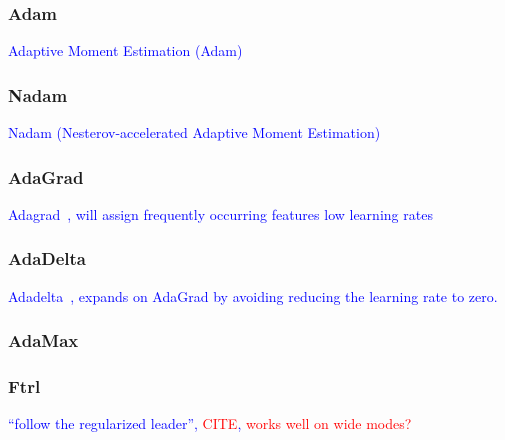 \subsubsection{Adam}

\textcolor{blue}{Adaptive Moment Estimation (Adam)~\cite{kingma2014adam}}



\subsubsection{Nadam}

\textcolor{blue}{Nadam (Nesterov-accelerated Adaptive Moment Estimation)~\cite{dozat2016incorporating}}

\subsubsection{AdaGrad}

\textcolor{blue}{Adagrad~\cite{duchi2011adaptive}, will assign frequently occurring features low learning rates}

\subsubsection{AdaDelta}

\textcolor{blue}{Adadelta~\cite{zeiler2012adadelta}, expands on AdaGrad by avoiding reducing the learning rate to zero.}

\subsubsection{AdaMax}

\subsubsection{Ftrl}

\textcolor{blue}{``follow the regularized leader'', \textcolor{red}{CITE}, \textcolor{red}{works well on wide modes?}}






